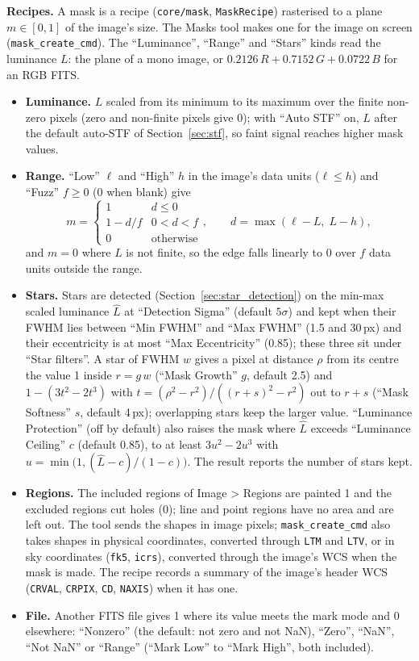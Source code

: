 \documentclass[11pt,a4paper]{article}
\newcommand{\code}[1]{\texttt{\small #1}}
\begin{document}
    \textbf{Recipes.} A mask is a recipe (\code{core/mask}, \code{MaskRecipe}) rasterised to a plane $m \in [0, 1]$ of the image's size. The Masks tool makes one for the image on screen (\code{mask\_create\_cmd}). The ``Luminance'', ``Range'' and ``Stars'' kinds read the luminance $L$: the plane of a mono image, or $0.2126\,R + 0.7152\,G + 0.0722\,B$ for an RGB FITS.
    \begin{itemize}[leftmargin=*]
        \item \textbf{Luminance.} $L$ scaled from its minimum to its maximum over the finite non-zero pixels (zero and non-finite pixels give 0); with ``Auto STF'' on, $L$ after the default auto-STF of Section~\ref{sec:stf}, so faint signal reaches higher mask values.
        \item \textbf{Range.} ``Low'' $\ell$ and ``High'' $h$ in the image's data units ($\ell \le h$) and ``Fuzz'' $f \ge 0$ (0 when blank) give
        \begin{equation}
            m = \begin{cases} 1 & d \le 0 \\ 1 - d/f & 0 < d < f \\ 0 & \text{otherwise} \end{cases}, \qquad d = \max(\ell - L,\; L - h),
        \end{equation}
        and $m = 0$ where $L$ is not finite, so the edge falls linearly to 0 over $f$ data units outside the range.
        \item \textbf{Stars.} Stars are detected (Section~\ref{sec:star_detection}) on the min-max scaled luminance $\hat{L}$ at ``Detection Sigma'' (default $5\sigma$) and kept when their FWHM lies between ``Min FWHM'' and ``Max FWHM'' (1.5 and 30\,px) and their eccentricity is at most ``Max Eccentricity'' (0.85); these three sit under ``Star filters''. A star of FWHM $w$ gives a pixel at distance $\rho$ from its centre the value 1 inside $r = g\,w$ (``Mask Growth'' $g$, default 2.5) and $1 - (3t^2 - 2t^3)$ with $t = (\rho^2 - r^2)/((r + s)^2 - r^2)$ out to $r + s$ (``Mask Softness'' $s$, default 4\,px); overlapping stars keep the larger value. ``Luminance Protection'' (off by default) also raises the mask where $\hat{L}$ exceeds ``Luminance Ceiling'' $c$ (default 0.85), to at least $3u^2 - 2u^3$ with $u = \min\big(1, (\hat{L} - c)/(1 - c)\big)$. The result reports the number of stars kept.
        \item \textbf{Regions.} The included regions of Image \textgreater{} Regions are painted 1 and the excluded regions cut holes (0); line and point regions have no area and are left out. The tool sends the shapes in image pixels; \code{mask\_create\_cmd} also takes shapes in physical coordinates, converted through \code{LTM} and \code{LTV}, or in sky coordinates (\code{fk5}, \code{icrs}), converted through the image's WCS when the mask is made. The recipe records a summary of the image's header WCS (\code{CRVAL}, \code{CRPIX}, \code{CD}, \code{NAXIS}) when it has one.
        \item \textbf{File.} Another FITS file gives 1 where its value meets the mark mode and 0 elsewhere: ``Nonzero'' (the default: not zero and not NaN), ``Zero'', ``NaN'', ``Not NaN'' or ``Range'' (``Mark Low'' to ``Mark High'', both included).
    \end{itemize}
\end{document}
